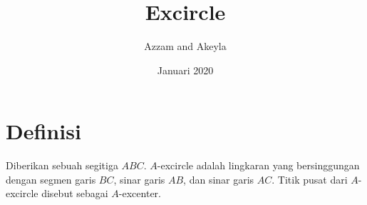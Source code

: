 \documentclass[11pt]{scrartcl}
\title{Excircle}
\author{Azzam and Akeyla}
\date{Januari 2020}
\begin{document}
\maketitle

\renewcommand*\contentsname{Daftar Isi}
\tableofcontents

\newpage

\section{Definisi}
\begin{definition}
Diberikan sebuah segitiga $ABC$. $A$-excircle adalah lingkaran yang bersinggungan dengan segmen garis $BC$, sinar garis $AB$, dan sinar garis $AC$. Titik pusat dari $A$-excircle disebut sebagai $A$-excenter.
\end{definition}
\end{document}
